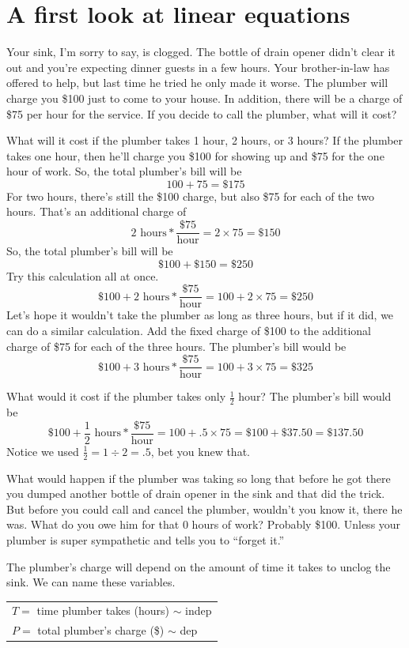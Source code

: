 

\section{A first look at linear equations}

Your sink, I'm sorry to say, is clogged.  The bottle of drain opener didn't clear it out and you're expecting dinner guests in a few hours.  Your brother-in-law has offered to help, but last time he tried he only made it worse.  The plumber will charge you \$100 just to come to your house.  In addition, there will be a charge of \$75 per hour for the service.  If you decide to call the plumber, what will it cost?

What will it cost if the plumber takes 1 hour, 2 hours, or 3 hours?  If the plumber takes one hour, then he'll charge you \$100 for showing up and \$75 for the one hour of work.  So, the total plumber's bill will be 
$$100 + 75 = \$175$$  
For two hours, there's still the \$100 charge, but also \$75 for each of the two hours.  That's an additional charge of 
$$2 \text{ hours} \ast \frac{\$75}{\text{hour}} =2 \times 75= \$150$$  
So, the total plumber's bill will be 
$$\$100 + \$150 = \$250$$
Try this calculation all at once.
$$\$100 + 2 \text{ hours} \ast \frac{\$75}{\text{hour}} = 100 + 2 \times 75 = \$250$$   
Let's hope it wouldn't take the plumber as long as three hours, but if it did, we can do a similar calculation.  Add the fixed charge of \$100 to the additional charge of \$75 for each of the three hours.  The plumber's bill would be 
$$ \$100 + 3 \text{ hours} \ast \frac{\$75}{\text{hour}} = 100 + 3 \times 75 = \$325$$  

What would it cost if the plumber takes only $\frac{1}{2}$ hour?  The plumber's bill would be 
$$\$100 + \frac{1}{2} \text{ hours} \ast \frac{\$75}{\text{hour}} =100 + .5 \times 75  = \$100 + \$37.50 = \$137.50$$  
Notice we used $\frac{1}{2}=1 \div 2 = .5$, bet you knew that.

What would happen if the plumber was taking so long that before he got there you dumped another bottle of drain opener in the sink and that did the trick.  But before you could call and cancel the plumber, wouldn't you know it, there he was.  What do you owe him for that 0 hours of work?  Probably \$100.  Unless your plumber is super sympathetic and tells you to ``forget it.''  %

The plumber's charge will depend on the amount of time it takes to unclog the sink.  We can name these variables.
\begin{center}
\begin{tabular} {l} 
$T=$ time plumber takes (hours) $\sim$ indep \\
$P= $ total plumber's charge (\$) $\sim$ dep \\ 
\end{tabular}
\end{center}

